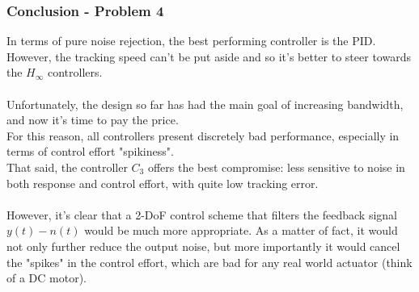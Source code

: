 \documentclass[a4paper, 12pt]{article}
\begin{document}
\subsubsection{Conclusion - Problem 4}
In terms of pure noise rejection, the best performing controller is the PID. However, the tracking speed can't be put aside and so it's better to steer towards the $H_\infty$ controllers.\\\\
Unfortunately, the design so far has had the main goal of increasing bandwidth, and now it's time to pay the price.\\
For this reason, all controllers present discretely bad performance, especially in terms of control effort "spikiness".\\
That said, the controller $C_3$ offers the best compromise: less sensitive to noise in both response and control effort, with quite low tracking error.\\\\
However, it's clear that a 2-DoF control scheme that filters the feedback signal $y(t)-n(t)$ would be much more appropriate. As a matter of fact, it would not only further reduce the output noise, but more importantly it would cancel the "spikes" in the control effort, which are bad for any real world actuator (think of a DC motor).
\end{document}

